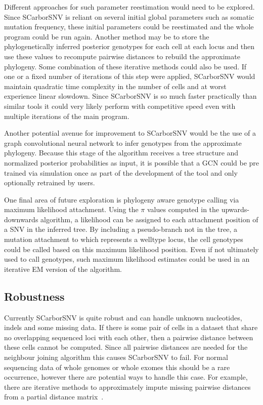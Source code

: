 \documentclass[../main.tex]{subfiles}
\begin{document}
Different approaches for such parameter reestimation would need to be explored.
Since SCarborSNV is reliant on several initial global parameters such as somatic mutation frequency, these initial parameters could be reestimated and the whole program could be run again.
Another method may be to store the phylogenetically inferred posterior genotypes for each cell at each locus and then use these values to recompute pairwise distances to rebuild the approximate phylogeny.
Some combination of these iterative methods could also be used.
If one or a fixed number of iterations of this step were applied, SCarborSNV would maintain quadratic time complexity in the number of cells and at worst experience linear slowdown.
Since SCarborSNV is so much faster practically than similar tools it could very likely perform with competitive speed even with multiple iterations of the main program.

Another potential avenue for improvement to SCarborSNV would be the use of a graph convolutional neural network to infer genotypes from the approximate phylogeny.
Because this stage of the algorithm receives a tree structure and normalized posterior probabilities as input, it is possible that a GCN could be pre trained via simulation once as part of the development of the tool and only optionally retrained by users.

One final area of future exploration is phylogeny aware genotype calling via maximum likelihood attachment.
Using the $\pi$ values computed in the upwards-downwards algorithm, a likelihood can be assigned to each attachment position of a SNV in the inferred tree.
By including a pseudo-branch not in the tree, a mutation attachment to which represents a welltype locus, the cell genotypes could be called based on this maximum likelihood position.
Even if not ultimately used to call genotypes, such maximum likelihood estimates could be used in an iterative EM version of the algorithm.

\subsection{Robustness}
Currently SCarborSNV is quite robust and can handle unknown nucleotides, indels and some missing data.
If there is some pair of cells in a dataset that share no overlapping sequenced loci with each other, then a pairwise distance between these cells cannot be computed.
Since all pairwise distances are needed for the neighbour joining algorithm this causes SCarborSNV to fail.
For normal sequencing data of whole genomes or whole exomes this should be a rare occurrence, however there are potential ways to handle this case.
For example, there are iterative methods to approximately impute missing pairwise distances from a partial distance matrix~\cite{missingNJ}.
\end{document}
